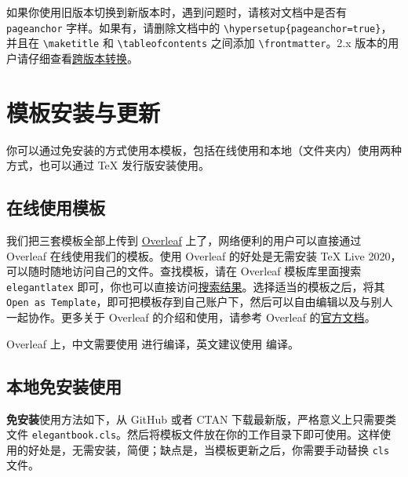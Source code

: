 \documentclass[cn,10pt,math=newtx,citestyle=gb7714-2015,bibstyle=gb7714-2015]{elegantbook}
\begin{document}
\begin{note}
如果你使用旧版本切换到新版本时，遇到问题时，请核对文档中是否有 \lstinline{pageanchor} 字样。如果有，请删除文档中的 \lstinline|\hypersetup{pageanchor=true}|，并且在 \lstinline{\maketitle} 和 \lstinline{\tableofcontents} 之间添加 \lstinline{\frontmatter}。2.x 版本的用户请仔细查看\href{https://github.com/ElegantLaTeX/ElegantBook/wiki/convert}{跨版本转换}。
\end{note}

\section{模板安装与更新}

你可以通过免安装的方式使用本模板，包括在线使用和本地（文件夹内）使用两种方式，也可以通过 \TeX{} 发行版安装使用。

\subsection{在线使用模板}

我们把三套模板全部上传到 \href{https://www.overleaf.com/}{Overleaf} 上了，网络便利的用户可以直接通过 Overleaf 在线使用我们的模板。使用 Overleaf 的好处是无需安装 \TeX{} Live 2020，可以随时随地访问自己的文件。查找模板，请在 Overleaf 模板库里面搜索 \lstinline{elegantlatex} 即可，你也可以直接访问\href{https://www.overleaf.com/latex/templates?addsearch=elegantlatex}{搜索结果}。选择适当的模板之后，将其 \lstinline{Open as Template}，即可把模板存到自己账户下，然后可以自由编辑以及与别人一起协作。更多关于 Overleaf 的介绍和使用，请参考 Overleaf 的\href{https://www.overleaf.com/learn}{官方文档}。

\begin{remark}
Overleaf 上，中文需要使用  进行编译，英文建议使用  编译。
\end{remark}

\subsection{本地免安装使用}

\textbf{免安装}使用方法如下，从 GitHub 或者 CTAN 下载最新版，严格意义上只需要类文件 \lstinline{elegantbook.cls}。然后将模板文件放在你的工作目录下即可使用。这样使用的好处是，无需安装，简便；缺点是，当模板更新之后，你需要手动替换 \lstinline{cls} 文件。
\end{document}
